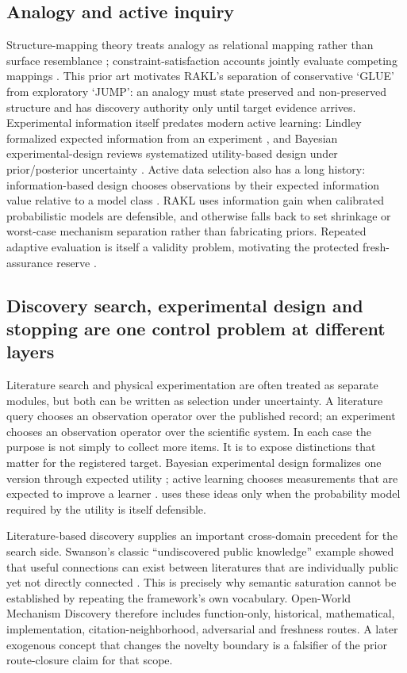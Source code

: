\subsection{Analogy and active inquiry}
Structure-mapping theory treats analogy as relational mapping rather than surface resemblance \cite{gentner1983}; constraint-satisfaction accounts jointly evaluate competing mappings \cite{holyoak1989}. This prior art motivates RAKL's separation of conservative `GLUE' from exploratory `JUMP': an analogy must state preserved and non-preserved structure and has discovery authority only until target evidence arrives. Experimental information itself predates modern active learning: Lindley formalized expected information from an experiment \cite{lindley1956}, and Bayesian experimental-design reviews systematized utility-based design under prior/posterior uncertainty \cite{chaloner1995}. Active data selection also has a long history: information-based design chooses observations by their expected information value relative to a model class \cite{mackay1992}. RAKL uses information gain when calibrated probabilistic models are defensible, and otherwise falls back to set shrinkage or worst-case mechanism separation rather than fabricating priors. Repeated adaptive evaluation is itself a validity problem, motivating the protected fresh-assurance reserve \cite{dwork2015}.

\subsection{Discovery search, experimental design and stopping are one control problem at different layers}

Literature search and physical experimentation are often treated as separate modules, but both can be written as selection under uncertainty. A literature query chooses an observation operator over the published record; an experiment chooses an observation operator over the scientific system. In each case the purpose is not simply to collect more items. It is to expose distinctions that matter for the registered target. Bayesian experimental design formalizes one version through expected utility \cite{lindley1956,chaloner1995}; active learning chooses measurements that are expected to improve a learner \cite{mackay1992}. \RAKL{} uses these ideas only when the probability model required by the utility is itself defensible.

Literature-based discovery supplies an important cross-domain precedent for the search side. Swanson's classic ``undiscovered public knowledge'' example showed that useful connections can exist between literatures that are individually public yet not directly connected \cite{swanson1986}. This is precisely why semantic saturation cannot be established by repeating the framework's own vocabulary. Open-World Mechanism Discovery therefore includes function-only, historical, mathematical, implementation, citation-neighborhood, adversarial and freshness routes. A later exogenous concept that changes the novelty boundary is a falsifier of the prior route-closure claim for that scope.

